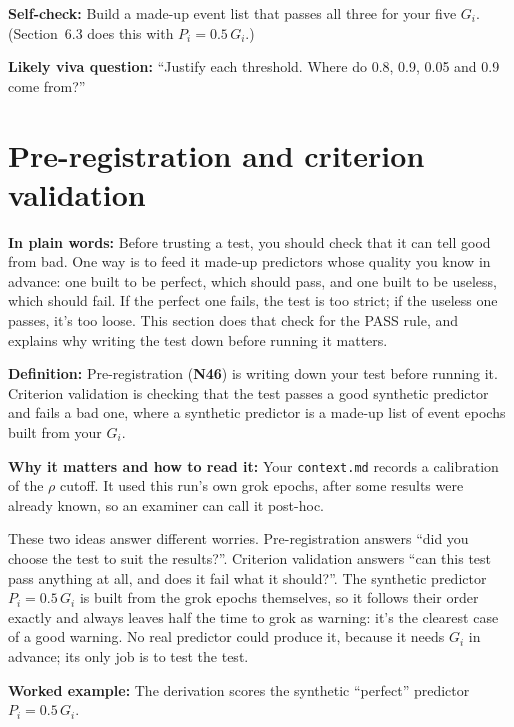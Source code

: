 \documentclass[11pt,a4paper,oneside,openany]{report}
\newcommand{\code}[1]{\texttt{#1}}
\newcommand{\gl}[1]{\textbf{#1}}   %
\newcommand{\fplain}{\textbf{In plain words:} }
\newcommand{\fdef}{\textbf{Definition:} }
\newcommand{\fread}{\par\textbf{Why it matters and how to read it:} }
\newcommand{\fex}{\par\textbf{Worked example:} }
\newcommand{\fself}{\par\textbf{Self-check:} }
\newcommand{\fviva}{\par\textbf{Likely viva question:} }
\begin{document}
\fself Build a made-up event list that passes all three for your five $G_i$. (Section~6.3 does this with $P_i = 0.5\,G_i$.)
\fviva ``Justify each threshold. Where do 0.8, 0.9, 0.05 and 0.9 come from?''

\section{Pre-registration and criterion validation}
\fplain Before trusting a test, you should check that it can tell good from bad. One way is to feed it made-up predictors whose quality you know in advance: one built to be perfect, which should pass, and one built to be useless, which should fail. If the perfect one fails, the test is too strict; if the useless one passes, it's too loose. This section does that check for the PASS rule, and explains why writing the test down before running it matters.

\fdef Pre-registration (\gl{N46}) is writing down your test before running it. Criterion validation is checking that the test passes a good synthetic predictor and fails a bad one, where a synthetic predictor is a made-up list of event epochs built from your $G_i$.
\fread Your \code{context.md} records a calibration of the $\rho$ cutoff. It used this run's own grok epochs, after some results were already known, so an examiner can call it post-hoc.

These two ideas answer different worries. Pre-registration answers ``did you choose the test to suit the results?''. Criterion validation answers ``can this test pass anything at all, and does it fail what it should?''. The synthetic predictor $P_i = 0.5\,G_i$ is built from the grok epochs themselves, so it follows their order exactly and always leaves half the time to grok as warning: it's the clearest case of a good warning. No real predictor could produce it, because it needs $G_i$ in advance; its only job is to test the test.

\fex The derivation scores the synthetic ``perfect'' predictor $P_i = 0.5\,G_i$.
\end{document}
